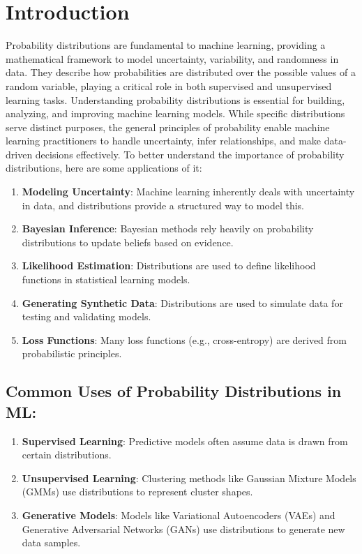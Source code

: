 \section{Introduction}
Probability distributions are fundamental to machine learning, providing a mathematical framework to model uncertainty, variability, and randomness in data. They describe how probabilities are distributed over the possible values of a random variable, playing a critical role in both supervised and unsupervised learning tasks. Understanding probability distributions is essential for building, analyzing, and improving machine learning models. While specific distributions serve distinct purposes, the general principles of probability enable machine learning practitioners to handle uncertainty, infer relationships, and make data-driven decisions effectively. To better understand the importance of probability distributions, here are some applications of it:
\begin{enumerate}
    \item \textbf{Modeling Uncertainty}: Machine learning inherently deals with uncertainty in data, and distributions provide a structured way to model this.
    \item \textbf{Bayesian Inference}: Bayesian methods rely heavily on probability distributions to update beliefs based on evidence.
    \item \textbf{Likelihood Estimation}: Distributions are used to define likelihood functions in statistical learning models.
    \item \textbf{Generating Synthetic Data}: Distributions are used to simulate data for testing and validating models.
    \item \textbf{Loss Functions}: Many loss functions (e.g., cross-entropy) are derived from probabilistic principles.
\end{enumerate}

\subsection*{Common Uses of Probability Distributions in ML:}
\begin{enumerate}
    \item \textbf{Supervised Learning}: Predictive models often assume data is drawn from certain distributions.
    \item \textbf{Unsupervised Learning}: Clustering methods like Gaussian Mixture Models (GMMs) use distributions to represent cluster shapes.
    \item \textbf{Generative Models}: Models like Variational Autoencoders (VAEs) and Generative Adversarial Networks (GANs) use distributions to generate new data samples.
\end{enumerate}

